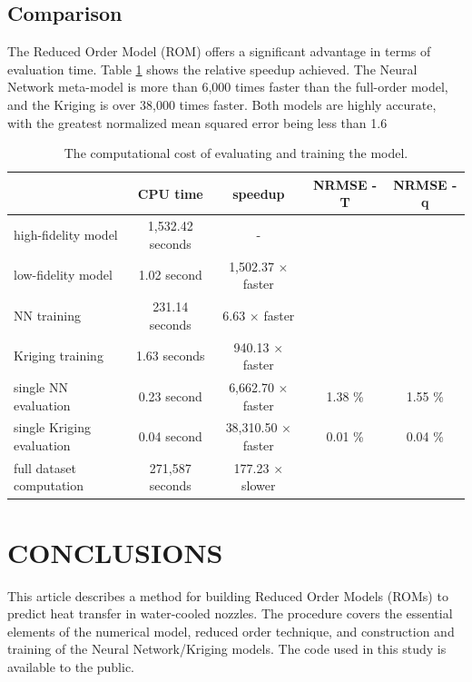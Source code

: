 \documentclass[10pt,fleqn,a4paper,twoside]{article}
\begin{document}
\subsection{Comparison}

The Reduced Order Model (ROM) offers a significant advantage in terms of evaluation time. Table \ref{tab:computcost} shows the relative speedup achieved. The Neural Network meta-model is more than 6,000 times faster than the full-order model, and the Kriging is over 38,000 times faster. Both models are highly accurate, with the greatest normalized mean squared error being less than 1.6%

\begin{table}  
	\caption{The computational cost of evaluating and training the model.}
     \label{tab:computcost}  
	\begin{center}
		\begin{tabular}{@{}l|c|c|c|c@{}}                 
            \hline%
            & CPU time & speedup & NRMSE - T & NRMSE - q \\ 
            \hline%
            high-fidelity model  & 1,532.42 seconds & - &  & \\
            low-fidelity model & 1.02 second & 1,502.37 $\times$ faster &  & \\ 
            NN training & 231.14 seconds & 6.63 $\times$ faster  &  & \\
            Kriging training & 1.63 seconds & 940.13 $\times$ faster  &  & \\
            single NN evaluation & 0.23 second  & 6,662.70 $\times$ faster & 1.38 \%  & 1.55 \% \\
            single Kriging evaluation & 0.04 second  & 38,310.50 $\times$ faster & 0.01 \%  & 0.04 \% \\
            full dataset computation & 271,587 seconds & 177.23 $\times$ slower &  & \\
            \hline%
		\end{tabular}
	\end{center}
\end{table}

\section{CONCLUSIONS}

This article describes a method for building Reduced Order Models (ROMs) to predict heat transfer in water-cooled nozzles. The procedure covers the essential elements of the numerical model, reduced order technique, and construction and training of the Neural Network/Kriging models. The code used in this study is available to the public.
\end{document}
